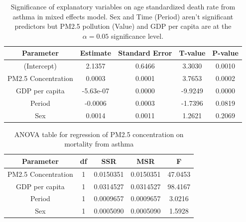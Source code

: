 \documentclass[12pt, letterpaper, twoside]{article}\usepackage[]{graphicx}\usepackage[]{xcolor}
\begin{document}
\begin{table}[h!]
\centering
\begin{tabular}{|c | c c c c|}
\toprule
Parameter & Estimate & Standard Error & T-value & P-value \\ [0.5ex]
\midrule
(Intercept) &	2.1357 &	0.6466 &	3.3030 &	0.0010 \\
PM2.5 Concentration &	0.0003 &	0.0001 &	3.7653 &	0.0002 \\
GDP per capita &	-5.63e-07	 &	0.0000 &	-9.9249 &	0.0000 \\
Period &	-0.0006 &	0.0003 &	-1.7396 &	0.0819 \\
Sex &	0.0014 &	0.0011 &	1.2621 &	0.2069 \\ [1ex]
\bottomrule
\end{tabular}
\label{tab:table1}
\caption{Significance of explanatory variables on age standardized death rate
  from asthma in mixed effects model. Sex and Time (Period) aren't significant
  predictors but PM2.5 pollution (Value) and GDP per capita are at the
  \begin{math}\alpha = 0.05\end{math} significance level.}
\end{table}

\begin{table}[h!]
\centering
\begin{tabular}{|c | c c c c|}
\toprule
Parameter & df & SSR & MSR & F \\ [0.5ex]
\midrule
PM2.5 Concentration & 1 & 0.0150351 & 0.0150351 & 47.0453 \\
GDP per capita & 1 & 0.0314527 & 0.0314527 & 98.4167 \\
Period & 1 & 0.0009657 & 0.0009657 & 3.0216 \\
Sex & 1 & 0.0005090 & 0.0005090 & 1.5928 \\ [1ex]
\bottomrule
\end{tabular}
\label{tab:table2}
\caption{ANOVA table for regression of PM2.5 concentration on mortality from
asthma}
\end{table}
\end{document}
